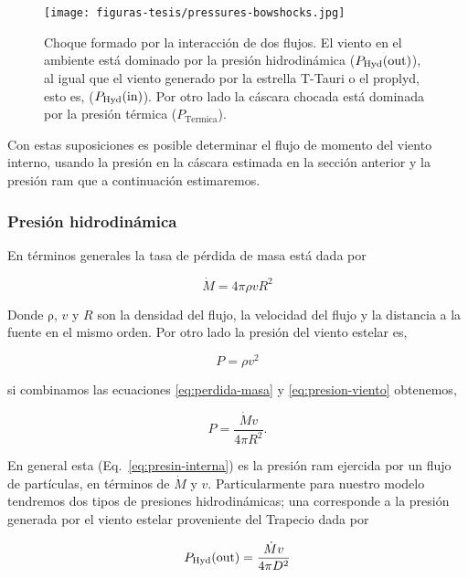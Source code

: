 \begin{figure}
  \centering
  \texttt{[image: figuras-tesis/pressures-bowshocks.jpg]}
  \caption{Choque formado por la interacción de dos flujos. El viento en el ambiente está dominado por la presión hidrodinámica  (\(P_{\text{Hyd}}(\mathrm{out}{})\)), al igual que el viento generado por la estrella T-Tauri o el proplyd, esto es, (\(P_{\text{Hyd}}(\mathrm{in}{})\)). Por otro lado la cáscara chocada está dominada por la presión térmica (\(P_{\text{Termica}}\)).}
  \label{fig:interaction}
\end{figure}
 
Con estas suposiciones es posible determinar el flujo de momento del viento interno, usando la presión en la cáscara estimada en la sección anterior y la presión ram que a continuación estimaremos.  

\subsubsection{Presión hidrodinámica}
\label{sec:pressure}

 En términos generales la tasa de pérdida de masa está dada por

\begin{equation}
  \label{eq:perdida-masa}
  \dot{M}=4\pi \rho v R^{2}
\end{equation}

Donde \(\mathrm{\rho}\), \(v\) y \(R\) son la densidad del flujo, la velocidad del flujo y la distancia a la fuente en el mismo orden. Por otro lado la presión del viento estelar es,

\begin{equation}
  \label{eq:presion-viento}
  P=\rho v^{2}
\end{equation}

si combinamos las ecuaciones \ref{eq:perdida-masa} y \ref{eq:presion-viento} obtenemos,

\begin{equation}
  \label{eq:presin-interna}
  P=\frac{\dot{M} v}{4 \pi R^{2}}. 
\end{equation}
 
En general esta (Eq.~\ref{eq:presin-interna}) es la presión ram ejercida por un flujo de partículas, en términos de \(\dot{M}\) y \(v\). Particularmente para nuestro modelo tendremos  dos tipos de presiones hidrodinámicas; una corresponde a la presión generada por el viento estelar proveniente del Trapecio dada por

\begin{equation}
  \label{eq:presion-externa}
   P_{\text{Hyd}}(\mathrm{out}{})=\frac{\dot{M}v}{4 \pi D^{2}}
\end{equation}

